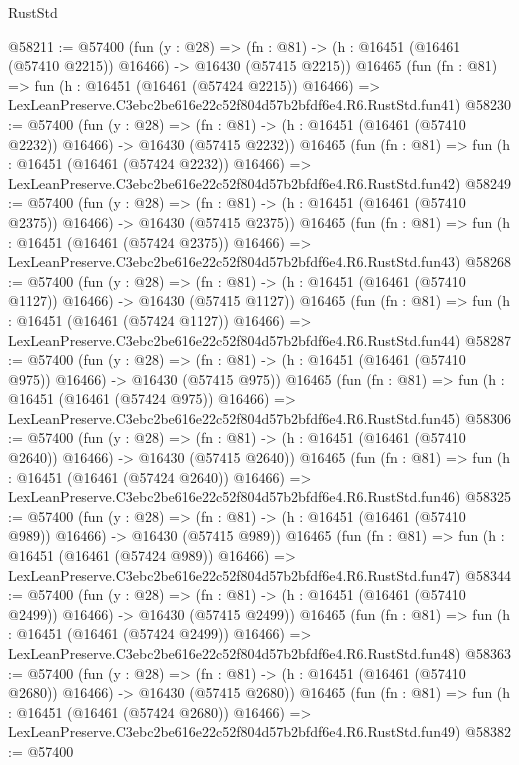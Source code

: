 \begin{lexlean}{RustStd}
\begin{coremodule}
@58211 := @57400
    (fun (y : @28) =>
    (fn : @81) -> (h : @16451 (@16461 (@57410 @2215)) @16466) -> @16430 (@57415 @2215))
    @16465
    (fun (fn : @81) =>
    fun (h : @16451 (@16461 (@57424 @2215)) @16466) =>
    LexLeanPreserve.C3ebc2be616e22c52f804d57b2bfdf6e4.R6.RustStd.fun41)
@58230 := @57400
    (fun (y : @28) =>
    (fn : @81) -> (h : @16451 (@16461 (@57410 @2232)) @16466) -> @16430 (@57415 @2232))
    @16465
    (fun (fn : @81) =>
    fun (h : @16451 (@16461 (@57424 @2232)) @16466) =>
    LexLeanPreserve.C3ebc2be616e22c52f804d57b2bfdf6e4.R6.RustStd.fun42)
@58249 := @57400
    (fun (y : @28) =>
    (fn : @81) -> (h : @16451 (@16461 (@57410 @2375)) @16466) -> @16430 (@57415 @2375))
    @16465
    (fun (fn : @81) =>
    fun (h : @16451 (@16461 (@57424 @2375)) @16466) =>
    LexLeanPreserve.C3ebc2be616e22c52f804d57b2bfdf6e4.R6.RustStd.fun43)
@58268 := @57400
    (fun (y : @28) =>
    (fn : @81) -> (h : @16451 (@16461 (@57410 @1127)) @16466) -> @16430 (@57415 @1127))
    @16465
    (fun (fn : @81) =>
    fun (h : @16451 (@16461 (@57424 @1127)) @16466) =>
    LexLeanPreserve.C3ebc2be616e22c52f804d57b2bfdf6e4.R6.RustStd.fun44)
@58287 := @57400
    (fun (y : @28) =>
    (fn : @81) -> (h : @16451 (@16461 (@57410 @975)) @16466) -> @16430 (@57415 @975))
    @16465
    (fun (fn : @81) =>
    fun (h : @16451 (@16461 (@57424 @975)) @16466) =>
    LexLeanPreserve.C3ebc2be616e22c52f804d57b2bfdf6e4.R6.RustStd.fun45)
@58306 := @57400
    (fun (y : @28) =>
    (fn : @81) -> (h : @16451 (@16461 (@57410 @2640)) @16466) -> @16430 (@57415 @2640))
    @16465
    (fun (fn : @81) =>
    fun (h : @16451 (@16461 (@57424 @2640)) @16466) =>
    LexLeanPreserve.C3ebc2be616e22c52f804d57b2bfdf6e4.R6.RustStd.fun46)
@58325 := @57400
    (fun (y : @28) =>
    (fn : @81) -> (h : @16451 (@16461 (@57410 @989)) @16466) -> @16430 (@57415 @989))
    @16465
    (fun (fn : @81) =>
    fun (h : @16451 (@16461 (@57424 @989)) @16466) =>
    LexLeanPreserve.C3ebc2be616e22c52f804d57b2bfdf6e4.R6.RustStd.fun47)
@58344 := @57400
    (fun (y : @28) =>
    (fn : @81) -> (h : @16451 (@16461 (@57410 @2499)) @16466) -> @16430 (@57415 @2499))
    @16465
    (fun (fn : @81) =>
    fun (h : @16451 (@16461 (@57424 @2499)) @16466) =>
    LexLeanPreserve.C3ebc2be616e22c52f804d57b2bfdf6e4.R6.RustStd.fun48)
@58363 := @57400
    (fun (y : @28) =>
    (fn : @81) -> (h : @16451 (@16461 (@57410 @2680)) @16466) -> @16430 (@57415 @2680))
    @16465
    (fun (fn : @81) =>
    fun (h : @16451 (@16461 (@57424 @2680)) @16466) =>
    LexLeanPreserve.C3ebc2be616e22c52f804d57b2bfdf6e4.R6.RustStd.fun49)
@58382 := @57400

\end{coremodule}
\end{lexlean}

